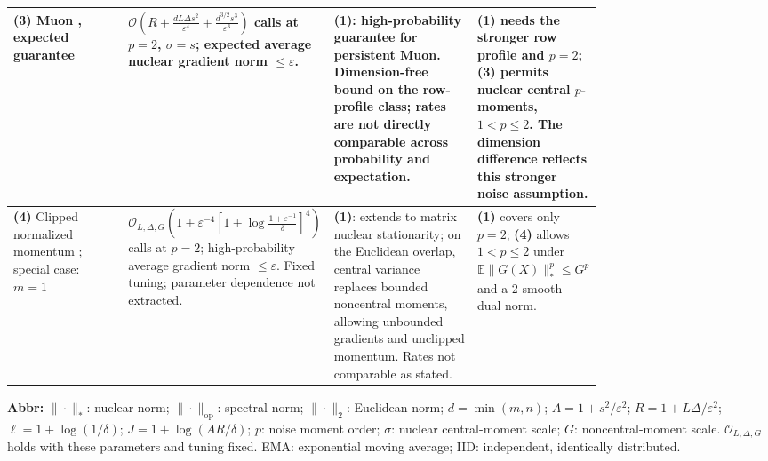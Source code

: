 \begin{table}[tp]
\begin{threeparttable}
\begin{tabularx}{\linewidth}{@{}>{\raggedright\arraybackslash}p{0.20\linewidth}>{\raggedright\arraybackslash}p{0.32\linewidth}>{\raggedright\arraybackslash}p{0.25\linewidth}>{\raggedright\arraybackslash}X@{}}
\midrule
\textbf{(3)} Muon \citep[Thm.~3.5]{fvssHubler2026v1}, expected guarantee
& $\mathcal{O}\!\left(R+\frac{dL\Delta s^2}{\varepsilon^4}+\frac{d^{3/2}s^3}{\varepsilon^3}\right)$ calls at $p=2$, $\sigma=s$; expected average nuclear gradient norm $\le\varepsilon$.
& \textbf{(1)}: high-probability guarantee for persistent Muon. Dimension-free bound on the row-profile class; rates are not directly comparable across probability and expectation.
& \textbf{(1)} needs the stronger row profile and $p=2$; \textbf{(3)} permits nuclear central $p$-moments, $1<p\le2$. The dimension difference reflects this stronger noise assumption. \\
\midrule
\textbf{(4)} Clipped normalized momentum \citep[Thm.~2]{fvssCutkosky2021v2}; special case: $m=1$
& $\mathcal{O}_{L,\Delta,G}\!\left(1+\varepsilon^{-4}\left[1+\log\frac{1+\varepsilon^{-1}}{\delta}\right]^4\right)$ calls at $p=2$; high-probability average gradient norm $\le\varepsilon$. Fixed tuning; parameter dependence not extracted.
& \textbf{(1)}: extends to matrix nuclear stationarity; on the Euclidean overlap, central variance replaces bounded noncentral moments, allowing unbounded gradients and unclipped momentum. Rates not comparable as stated.
& \textbf{(1)} covers only $p=2$; \textbf{(4)} allows $1<p\le2$ under $\mathbb{E}\|G(X)\|_*^p\le G^p$ and a $2$-smooth dual norm. \\
\bottomrule
\end{tabularx}
\begin{tablenotes}[flushleft]\footnotesize
\item[] \textbf{Abbr:} $\|\cdot\|_*$: nuclear norm; $\|\cdot\|_{\mathrm{op}}$: spectral norm; $\|\cdot\|_2$: Euclidean norm; $d=\min(m,n)$; $A=1+s^2/\varepsilon^2$; $R=1+L\Delta/\varepsilon^2$; $\ell=1+\log(1/\delta)$; $J=1+\log(AR/\delta)$; $p$: noise moment order; $\sigma$: nuclear central-moment scale; $G$: noncentral-moment scale. $\mathcal{O}_{L,\Delta,G}$ holds with these parameters and tuning fixed. EMA: exponential moving average; IID: independent, identically distributed.
\end{tablenotes}
\end{threeparttable}
\end{table}
\clearpage
